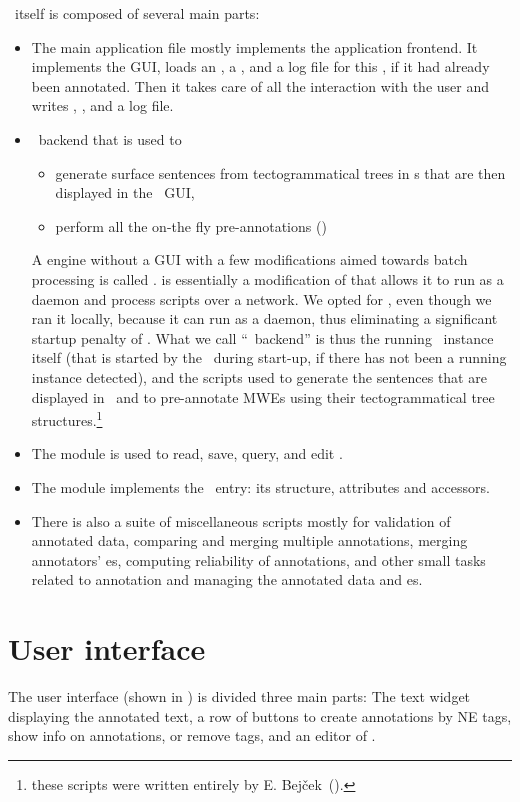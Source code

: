 \seman\ itself is composed of several main parts:
\begin{itemize}
  \item The main application file  mostly implements the application frontend. It implements the GUI, loads an \sf, a \semlex,  and a log file for this \sf, if it had already been annotated. Then it takes care of all the interaction with the user and writes \sf, \semlex, and a log file.
  \item \ntred\ backend that is used to 
	\begin{itemize}
	  \item generate surface sentences from tectogrammatical trees in \tf{}s that are then displayed in the \seman\ GUI,
	  \item perform all the on-the fly pre-annotations ()
	\end{itemize}
A \tred engine without a GUI with a few modifications aimed towards batch processing is called \btred. \ntred is essentially a modification of \btred that allows it to run as a daemon and process scripts over a network. We opted for \ntred, even though we ran it locally, because it can run as a daemon, thus eliminating a significant startup penalty of \btred. What we call ``\ntred\ backend'' is thus the running \ntred\ instance itself (that is started by the \seman\ during start-up, if there has not been a running instance detected), and the scripts used to generate the sentences that are displayed in \seman\ and to pre-annotate MWEs using their tectogrammatical tree structures.\footnote{these scripts were written entirely by E. Bejček~(\citeyear{bejcek:2010}).}
  \item The module  is used to read, save, query, and edit \semlex.
    \item The module  implements the \semlex\ entry: its structure, attributes and accessors.
  \item There is also a suite of miscellaneous scripts mostly for validation of annotated data, comparing and merging multiple annotations, merging annotators' \semlex{}es, computing reliability of annotations, and other small tasks related to annotation and managing the annotated data and \semlex{}es.
\end{itemize}

\section{User interface}
\label{sec:seman:gui}
The user interface (shown in ) is divided three main parts: The text widget displaying the annotated text, a row of buttons to create annotations by NE tags, show info on annotations, or remove tags, and an editor of \semlex. 



